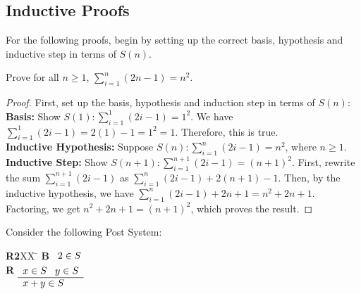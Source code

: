 \documentclass[]{exam}
\theoremstyle{definition}
\begin{document}
\begin{questions}
\section*{Inductive Proofs}
For the following proofs, begin by setting up the correct basis, hypothesis
and inductive step in terms of $S(n)$.


\question Prove for all $n \geq 1$, $\sum_{i=1}^{n} (2n - 1) = n^2$. 
\begin{solution}
\begin{proof}
First, set up the basis, hypothesis and induction step in terms of $S(n)$:
~\\
\textbf{Basis:} Show $S(1): \sum_{i=1}^1 (2i - 1) = 1^2$. We have $ \sum_{i=1}^1
(2i - 1) = 2(1) - 1 = 1^2 = 1$. Therefore, this is true.
~\\
\textbf{Inductive Hypothesis:} Suppose $S(n): \sum_{i=1}^{n}(2i - 1) = n^2$, 
  where $n \geq 1$.
~\\
\textbf{Inductive Step:} Show $S(n+1): \sum_{i=1}^{n+1} (2i - 1) = (n + 1)^2$. 
First, rewrite the sum $\sum_{i=1}^{n+1} (2i - 1)$ as $\sum_{i=1}^{n}
(2i - 1) + 2(n+1) - 1$. Then, by the inductive hypothesis, we have $\sum_{i=1}^{n}
(2i - 1) + 2n + 1 = n^2 + 2n + 1$. Factoring, we get $n^2 + 2n + 1 = (n + 1)^2$,
which proves the result.
\end{proof}

\end{solution}

\question Consider the following Post System:
\begin{tabbing}
{\bf R2}XX \=  \kill
{\bf B} \>
        \(\begin{array}[t]{l}
        2\in S
        \end{array}\) \\[2ex]
{\bf R} \>
        \(\begin{array}[t]{l}
        x \in S \;\;\;y \in S \\
        \hline
        x + y \in S
        \end{array}\)
\end{tabbing}


\end{questions}
\end{document}
